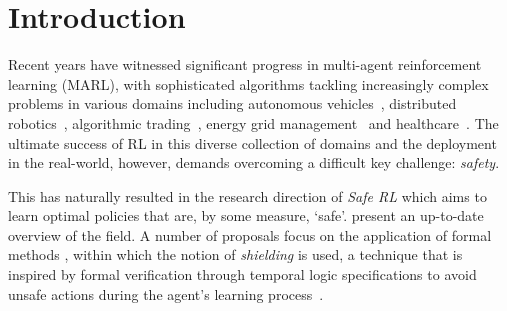 \documentclass{ecai}
\theoremstyle{plain}
\theoremstyle{definition}
\theoremstyle{remark}
\begin{document}

 


\section{Introduction}


Recent years have witnessed significant progress in multi-agent reinforcement learning (MARL), with sophisticated algorithms tackling increasingly complex problems in various domains including autonomous vehicles~\citep{shalev2016safe}, distributed robotics~\citep{brambilla2013swarm}, algorithmic trading~\citep{ganesh2019reinforcement}, energy grid management~\citep{van2023multi} and healthcare~\citep{riek2017healthcare}. The ultimate success of RL in this diverse collection of domains and the deployment in the real-world, however, demands overcoming a difficult key challenge: \textit{safety}.



This has naturally resulted in the research direction of \textit{Safe RL} which aims to learn optimal policies that are, by some measure, `safe'. \citet{gu2024review} present an up-to-date overview of the field. A number of proposals focus on the application of formal methods \citep{hunt2021verifiably,den2022planning}, within which the notion of \textit{shielding} is used, a technique that is inspired by formal verification through temporal logic specifications to avoid unsafe actions during the agent's learning process~\citep{bloem2015shield, alshiekh2018safe, jansen2020safe, carr2023safe}. 
\end{document}

